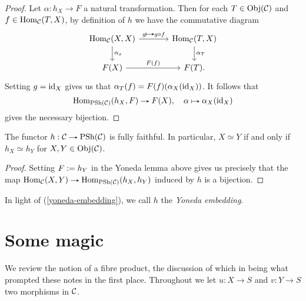 \begin{proof}
  Let $\alpha : h_X \to F$ a natural transformation. Then for each $T
  \in \operatorname{Obj}(\mathcal{C})$ and $f \in \operatorname{Hom}_{\mathcal{C}}(T,X)$, by definition of $h$ we have
  the commutative diagram
  \[
  \begin{tikzcd}[column sep = large]
    \Hom_\C(X,X) \rar{g \mapsto g \circ f} \dar{\alpha_x} &
    \Hom_\C(T,X) \dar{\alpha_T} \\ F(X) \rar{F(f)} & F(T).
  \end{tikzcd}
  \]
  Setting $g = \mathrm{id}_X$ gives us that $\alpha_T(f) =
  F(f)(\alpha_X(\mathrm{id}_X))$. It follows that
  \[
  \Hom_{\PSh(\C)}(h_X, F) \to F(X), \quad \alpha \mapsto
  \alpha_X(\id_X)
  \]
  gives the necessary bijection.
\end{proof}

\begin{corollary}
  \label{yoneda-embedding}
  The functor $h : \C \to \PSh(\C)$ is fully faithful. In particular, $X
  \simeq Y$ if and only if $h_X \simeq h_Y$ for $X,Y \in \operatorname{Obj}(\mathcal{C})$.
\end{corollary}

\begin{proof}
  Setting $F \mathrel{:=} h_Y$ in the Yoneda lemma above gives us
  precisely that the map $\Hom_\C(X,Y) \to \Hom_{\PSh(\C)}(h_X,h_Y)$
  induced by $h$ is a bijection.
\end{proof}

\begin{remark}
  In light of (\ref{yoneda-embedding}), we call $h$ the \textit{Yoneda
    embedding}.
\end{remark}


\section{Some magic}

We review the notion of a fibre product, the discussion of which in
\cite{gortzwedhorn} being what prompted these notes in the first
place. Throughout we let $u : X \to S$ and $v : Y \to S$ two morphisms
in $\mathcal{C}$.


